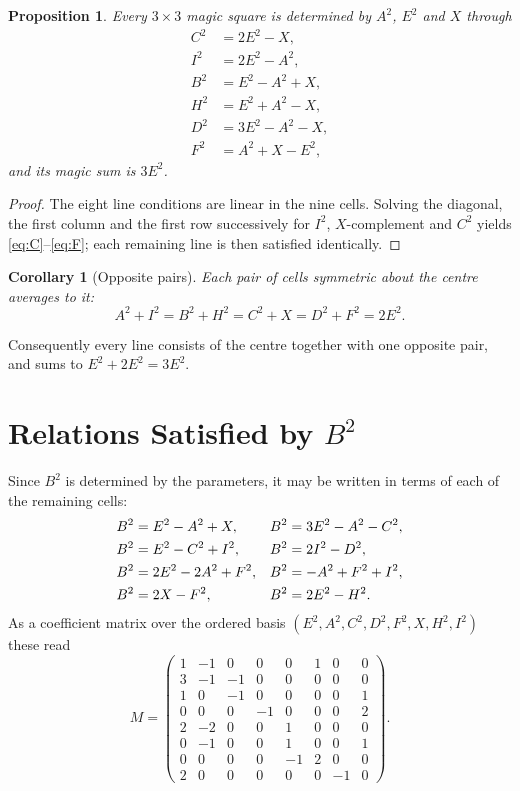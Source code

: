 \documentclass[12pt]{article}
\newtheorem{proposition}[theorem]{Proposition}
\newtheorem{corollary}[theorem]{Corollary}
\theoremstyle{remark}
\begin{document}
\begin{proposition}\label{prop:param}
Every $3\times3$ magic square is determined by $A^2$, $E^2$ and $X$
through
\begin{align}
C^2 &= 2E^2 - X, \label{eq:C}\\
I^2 &= 2E^2 - A^2, \label{eq:I}\\
B^2 &= E^2 - A^2 + X, \label{eq:B}\\
H^2 &= E^2 + A^2 - X, \label{eq:H}\\
D^2 &= 3E^2 - A^2 - X, \label{eq:D}\\
F^2 &= A^2 + X - E^2, \label{eq:F}
\end{align}
and its magic sum is $3E^2$.
\end{proposition}

\begin{proof}
The eight line conditions are linear in the nine cells. Solving the
diagonal, the first column and the first row successively for $I^2$,
$X$-complement and $C^2$ yields \eqref{eq:C}--\eqref{eq:F}; each
remaining line is then satisfied identically.
\end{proof}

\begin{corollary}[Opposite pairs]\label{cor:pairs}
Each pair of cells symmetric about the centre averages to it:
\[
A^2 + I^2 = B^2 + H^2 = C^2 + X = D^2 + F^2 = 2E^2 .
\]
\end{corollary}

Consequently every line consists of the centre together with one
opposite pair, and sums to $E^2 + 2E^2 = 3E^2$.

\section{Relations Satisfied by $B^2$}

Since $B^2$ is determined by the parameters, it may be written in terms
of each of the remaining cells:
\begin{align}
B^2 &= E^2 - A^2 + X, & B^2 &= 3E^2 - A^2 - C^2, \notag\\
B^2 &= E^2 - C^2 + I^2, & B^2 &= 2I^2 - D^2, \notag\\
B^2 &= 2E^2 - 2A^2 + F^2, & B^2 &= -A^2 + F^2 + I^2, \notag\\
B^2 &= 2X - F^2, & B^2 &= 2E^2 - H^2. \notag
\end{align}
As a coefficient matrix over the ordered basis
$(E^2, A^2, C^2, D^2, F^2, X, H^2, I^2)$ these read
\[
M =
\begin{pmatrix}
1 & -1 &  0 &  0 &  0 & 1 &  0 & 0 \\
3 & -1 & -1 &  0 &  0 & 0 &  0 & 0 \\
1 &  0 & -1 &  0 &  0 & 0 &  0 & 1 \\
0 &  0 &  0 & -1 &  0 & 0 &  0 & 2 \\
2 & -2 &  0 &  0 &  1 & 0 &  0 & 0 \\
0 & -1 &  0 &  0 &  1 & 0 &  0 & 1 \\
0 &  0 &  0 &  0 & -1 & 2 &  0 & 0 \\
2 &  0 &  0 &  0 &  0 & 0 & -1 & 0
\end{pmatrix}.
\]
\end{document}
